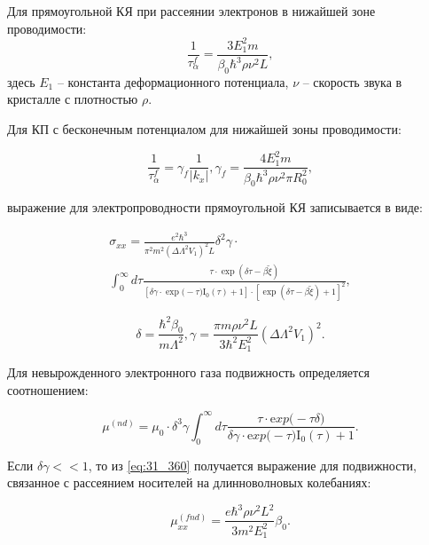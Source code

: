 Для прямоугольной КЯ при рассеянии электронов в нижайшей зоне проводимости:
\begin{equation} \label{eq:31_330}
\frac{1}{\tau _{\alpha }^{f} } =\frac{3E_{1}^{2} m}{\beta _{0} \hbar ^{3} \rho \nu ^{2} L},
\end{equation}
здесь $E_{1} $ -- константа деформационного потенциала, $\nu $ -- скорость звука в кристалле с плотностью $\rho $.

Для КП с бесконечным потенциалом для нижайшей зоны проводимости:

\begin{equation} \label{eq:31_340}
\frac{1}{\tau _{\alpha }^{f} } =\gamma _{f} \frac{1}{\left|k_{x} \right|} , \gamma _{f} =\frac{4E_{1}^{2} m}{\beta _{0} \hbar ^{3} \rho \nu ^{2} \pi R_{0}^{2} },
\end{equation}
 
\noindent выражение для электропроводности прямоугольной КЯ записывается в виде:

\begin{multline} \label{eq:31_350}
\sigma _{xx} =\frac{e^{2} \hbar ^{3} }{\pi ^{2} m^{2} \left(\Delta \Lambda ^{2} V_{1} \right)^{2} L} \delta ^{2} \gamma \cdot \\
 \int _{0}^{\infty }d\tau \frac{\tau \cdot {\exp}\left(\delta \tau -\beta \tilde{\xi }\right)}{\left[\delta \gamma \cdot {\exp(}-\tau ){\mathrm I}_{{\mathrm 0}} (\tau )+1\right]\cdot \left[{\exp}\left(\delta \tau -\beta \tilde{\xi }\right)+1\right]^{2} },
\end{multline}
  
\[
\delta =\frac{\hbar ^{2} \beta _{0} }{m\Lambda ^{2} } , \gamma =\frac{\pi m\rho \nu ^{2} L}{3\hbar ^{2} E_{1}^{2} } \left(\Delta \Lambda ^{2} V_{1} \right)^{2} .
\]
 
Для невырожденного электронного газа подвижность определяется соотношением:

\begin{equation} \label{eq:31_360}
\mu ^{(nd)} =\mu _{0} \cdot \delta ^{3} \gamma \int _{0}^{\infty }d\tau \frac{\tau \cdot {\mathrm exp(}-\tau \delta )}{\delta \gamma \cdot {\mathrm exp(}-\tau ){\mathrm I}_{{\mathrm 0}} (\tau )+1}. 
\end{equation}

Если $\delta \gamma <<1$, то из \eqref{eq:31_360} получается выражение для подвижности, связанное с рассеянием носителей на длинноволновых колебаниях:

\begin{equation} \label{eq:31_370}
\mu _{xx}^{(fnd)} =\frac{e\hbar ^{3} \rho \nu ^{2} L^{2} }{3m^{2} E_{1}^{2} } \beta _{0}. 
\end{equation}

